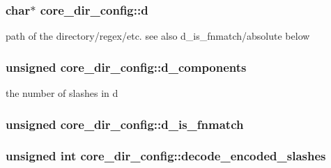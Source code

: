 \subsubsection[{\texorpdfstring{d}{d}}]{\setlength{\rightskip}{0pt plus 5cm}char$\ast$ core\+\_\+dir\+\_\+config\+::d}\hypertarget{structcore__dir__config_a21a73235f4a793d4c96c1e5ba5342e58}{}\label{structcore__dir__config_a21a73235f4a793d4c96c1e5ba5342e58}
path of the directory/regex/etc. see also d\+\_\+is\+\_\+fnmatch/absolute below 
\subsubsection[{\texorpdfstring{d\+\_\+components}{d_components}}]{\setlength{\rightskip}{0pt plus 5cm}unsigned core\+\_\+dir\+\_\+config\+::d\+\_\+components}\hypertarget{structcore__dir__config_ac59be2f20ea007744653dc26a629bfe3}{}\label{structcore__dir__config_ac59be2f20ea007744653dc26a629bfe3}
the number of slashes in d 
\subsubsection[{\texorpdfstring{d\+\_\+is\+\_\+fnmatch}{d_is_fnmatch}}]{\setlength{\rightskip}{0pt plus 5cm}unsigned core\+\_\+dir\+\_\+config\+::d\+\_\+is\+\_\+fnmatch}\hypertarget{structcore__dir__config_a08c5cc2c2eb487360ecd06db5fc52732}{}\label{structcore__dir__config_a08c5cc2c2eb487360ecd06db5fc52732}
\subsubsection[{\texorpdfstring{decode\+\_\+encoded\+\_\+slashes}{decode_encoded_slashes}}]{\setlength{\rightskip}{0pt plus 5cm}unsigned {\bf int} core\+\_\+dir\+\_\+config\+::decode\+\_\+encoded\+\_\+slashes}\hypertarget{structcore__dir__config_af26e55bab3033457c8a29bdfbb678ab2}{}\label{structcore__dir__config_af26e55bab3033457c8a29bdfbb678ab2}
